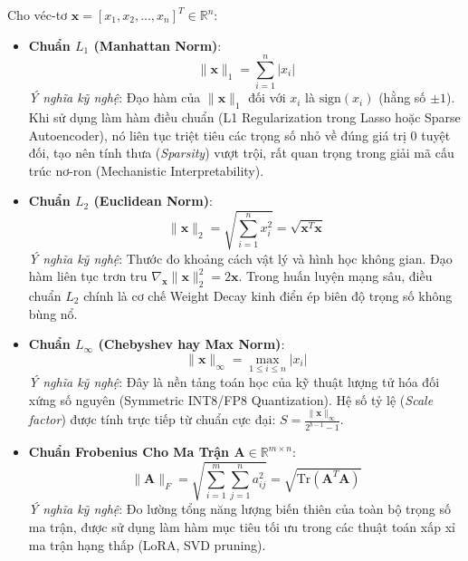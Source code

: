 Cho véc-tơ $\mathbf{x} = [x_1, x_2, \dots, x_n]^T \in \mathbb{R}^n$:
\begin{itemize}
  \item \textbf{Chuẩn $L_1$ (Manhattan Norm)}:
  \begin{equation}
  \|\mathbf{x}\|_1 = \sum_{i=1}^n |x_i|
  \end{equation}
  \textit{Ý nghĩa kỹ nghệ}: Đạo hàm của $\|\mathbf{x}\|_1$ đối với $x_i$ là $\text{sign}(x_i)$ (hằng số $\pm 1$). Khi sử dụng làm hàm điều chuẩn (L1 Regularization trong Lasso hoặc Sparse Autoencoder), nó liên tục triệt tiêu các trọng số nhỏ về đúng giá trị 0 tuyệt đối, tạo nên tính thưa (\textit{Sparsity}) vượt trội, rất quan trọng trong giải mã cấu trúc nơ-ron (Mechanistic Interpretability).

  \item \textbf{Chuẩn $L_2$ (Euclidean Norm)}:
  \begin{equation}
  \|\mathbf{x}\|_2 = \sqrt{\sum_{i=1}^n x_i^2} = \sqrt{\mathbf{x}^T \mathbf{x}}
  \end{equation}
  \textit{Ý nghĩa kỹ nghệ}: Thước đo khoảng cách vật lý và hình học không gian. Đạo hàm liên tục trơn tru $\nabla_{\mathbf{x}} \|\mathbf{x}\|_2^2 = 2\mathbf{x}$. Trong huấn luyện mạng sâu, điều chuẩn $L_2$ chính là cơ chế Weight Decay kinh điển ép biên độ trọng số không bùng nổ.

  \item \textbf{Chuẩn $L_\infty$ (Chebyshev hay Max Norm)}:
  \begin{equation}
  \|\mathbf{x}\|_\infty = \max_{1 \le i \le n} |x_i|
  \end{equation}
  \textit{Ý nghĩa kỹ nghệ}: Đây là nền tảng toán học của kỹ thuật lượng tử hóa đối xứng số nguyên (Symmetric INT8/FP8 Quantization). Hệ số tỷ lệ (\textit{Scale factor}) được tính trực tiếp từ chuẩn cực đại: $S = \frac{\|\mathbf{x}\|_\infty}{2^{b-1} - 1}$.

  \item \textbf{Chuẩn Frobenius Cho Ma Trận $\mathbf{A} \in \mathbb{R}^{m \times n}$}:
  \begin{equation}
  \|\mathbf{A}\|_F = \sqrt{\sum_{i=1}^m \sum_{j=1}^n a_{ij}^2} = \sqrt{\text{Tr}(\mathbf{A}^T \mathbf{A})}
  \end{equation}
  \textit{Ý nghĩa kỹ nghệ}: Đo lường tổng năng lượng biến thiên của toàn bộ trọng số ma trận, được sử dụng làm hàm mục tiêu tối ưu trong các thuật toán xấp xỉ ma trận hạng thấp (LoRA, SVD pruning).
\end{itemize}

